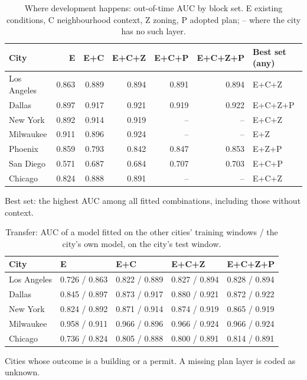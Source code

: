 \documentclass[10pt]{article}
\begin{document}
\begin{table}[h!]
\centering
\small
\setlength{\tabcolsep}{4pt}
\caption{Where development happens: out-of-time AUC by block set. E existing conditions, C neighbourhood context, Z zoning, P adopted plan; -- where the city has no such layer.}
\label{tab:auc}
\begin{tabular}{lrrrrrl}
\toprule
City & E & E+C & E+C+Z & E+C+P & E+C+Z+P & Best set (any) \\
\midrule
Los Angeles & 0.863 & 0.889 & 0.894 & 0.891 & 0.894 & E+C+Z \\
Dallas & 0.897 & 0.917 & 0.921 & 0.919 & 0.922 & E+C+Z+P \\
New York & 0.892 & 0.914 & 0.919 & -- & -- & E+C+Z \\
Milwaukee & 0.911 & 0.896 & 0.924 & -- & -- & E+Z \\
Phoenix & 0.859 & 0.793 & 0.842 & 0.847 & 0.853 & E+Z+P \\
San Diego & 0.571 & 0.687 & 0.684 & 0.707 & 0.703 & E+C+P \\
Chicago & 0.824 & 0.888 & 0.891 & -- & -- & E+C+Z \\
\bottomrule
\end{tabular}
\par\smallskip
\begin{minipage}{0.95\linewidth}\footnotesize Best set: the highest AUC among all fitted combinations, including those without context.\end{minipage}
\end{table}

\begin{table}[h!]
\centering
\small
\setlength{\tabcolsep}{4pt}
\caption{Transfer: AUC of a model fitted on the other cities' training windows / the city's own model, on the city's test window.}
\label{tab:transfer}
\begin{tabular}{lllll}
\toprule
City & E & E+C & E+C+Z & E+C+Z+P \\
\midrule
Los Angeles & 0.726 / 0.863 & 0.822 / 0.889 & 0.827 / 0.894 & 0.828 / 0.894 \\
Dallas & 0.845 / 0.897 & 0.873 / 0.917 & 0.880 / 0.921 & 0.872 / 0.922 \\
New York & 0.824 / 0.892 & 0.871 / 0.914 & 0.874 / 0.919 & 0.865 / 0.919 \\
Milwaukee & 0.958 / 0.911 & 0.966 / 0.896 & 0.966 / 0.924 & 0.966 / 0.924 \\
Chicago & 0.736 / 0.824 & 0.805 / 0.888 & 0.800 / 0.891 & 0.814 / 0.891 \\
\bottomrule
\end{tabular}
\par\smallskip
\begin{minipage}{0.95\linewidth}\footnotesize Cities whose outcome is a building or a permit. A missing plan layer is coded as unknown.\end{minipage}
\end{table}
\end{document}
